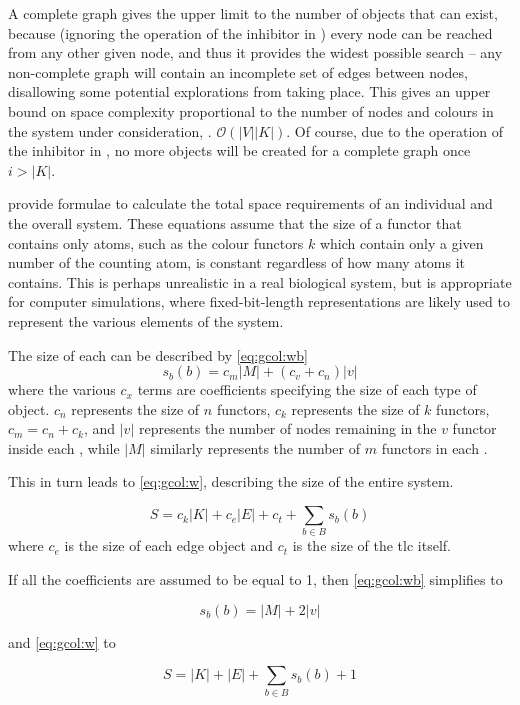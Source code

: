 A complete graph gives the upper limit to the number of objects that can exist, because (ignoring the operation of the \gls{inhibitor} in ) every node can be reached from any other given node, and thus it provides the widest possible search -- any non-complete graph will contain an incomplete set of edges between nodes, disallowing some potential explorations from taking place.  This gives an upper bound on space complexity proportional to the number of nodes and colours in the system under consideration, \ie{}. \(\mathcal{O}(|V||K|)\).  Of course, due to the operation of the \gls{inhibitor} in , no more \bo{} objects will be created for a complete graph once \(i > |K|\).

 provide formulae to calculate the total space requirements of an individual \bo{} and the overall system. These equations assume that the size of a \gls{functor} that contains only atoms, such as the colour \glspl{functor} \(k\) which contain only a given number of the counting atom, is constant regardless of how many atoms it contains.  This is perhaps unrealistic in a real biological system, but is appropriate for computer simulations, where fixed-bit-length representations are likely used to represent the various elements of the system.

The size of each \bo{} can be described by \cref{eq:gcol:wb}
\begin{equation}\label{eq:gcol:wb}
    s_b(b) = c_m |M| + (c_v + c_n) |v|
\end{equation} where the various \(c_x\) terms are coefficients specifying the size of each type of object.  \(c_n\) represents the size of \(n\) \glspl{functor}, \(c_k\) represents the size of \(k\) \glspl{functor}, \(c_m = c_n + c_k\), and \(|v|\) represents the number of nodes remaining in the \(v\) \gls{functor} inside each \bo{}, while \(|M|\) similarly represents the number of \(m\) \glspl{functor} in each \bo{}.

This in turn leads to \cref{eq:gcol:w}, describing the size of the entire system.

\begin{equation}\label{eq:gcol:w}
    S = c_k |K| + c_e |E| + c_t + \sum_{b \in B}s_b(b)
\end{equation} where \(c_e\) is the size of each edge object and \(c_t\) is the size of the \gls{tlc} itself.

If all the coefficients are assumed to be equal to 1, then \cref{eq:gcol:wb} simplifies to 

\begin{equation}
    s_b(b) = |M| + 2 |v|
\end{equation}

and \cref{eq:gcol:w} to

\begin{equation}
    S = |K| + |E| + \sum_{b \in B}s_b(b) + 1
\end{equation}